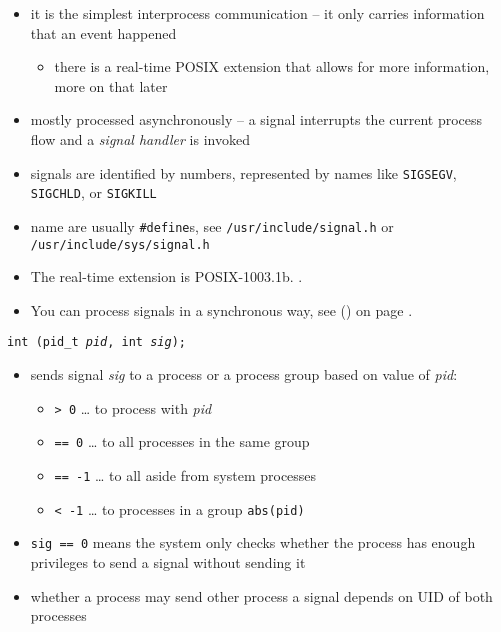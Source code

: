 
\begin{slide}
\begin{itemize}
\item it is the simplest interprocess communication -- it only carries
information that an event happened
\begin{itemize}
\item there is a real-time POSIX extension that allows for more information,
more on that later
\end{itemize}
\item mostly processed asynchronously -- a signal interrupts the current process
flow and a \emph{signal handler} is invoked
\item signals are identified by numbers, represented by names like
\texttt{SIGSEGV}, \texttt{SIGCHLD}, or \texttt{SIGKILL}
\item name are usually \texttt{\#define}s, see \texttt{/usr/include/signal.h} or
\texttt{/usr/include/sys/signal.h}
\end{itemize}
\end{slide}

\begin{itemize}
\item The real-time extension is POSIX-1003.1b.
\pageref{REALTIMEEXTENSIONS}.
\item You can process signals in a synchronous way, see () on
page \pageref{SIGWAIT}.
\end{itemize}



\begin{slide}
\texttt{int (pid\_t \emph{pid}, int \emph{sig});}
\begin{itemize}
\item sends signal \emph{sig} to a process or a process group
based on value of \emph{pid}: 
    \begin{itemize}
    \item \texttt{> 0} \dots{} to process with \emph{pid}
    \item \texttt{== 0} \dots{} to all processes in the same group
    \item \texttt{== -1} \dots{} to all aside from system processes
    \item \texttt{< -1} \dots{} to processes in a group \texttt{abs(pid)} 
    \end{itemize}
\item \texttt{sig == 0} means the system only checks whether the process has
enough privileges to send a signal without sending it
\item whether a process may send other process a signal depends on UID of both
processes
\end{itemize}
\end{slide}

